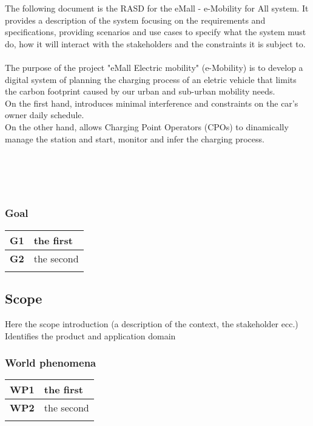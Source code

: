 The following document is the RASD for the eMall - e-Mobility for All system. It provides
a description of the system focusing on the requirements and specifications, providing scenarios and use cases
to specify what the system must do, how it will interact with the stakeholders and the constraints it is subject to.
\\\\
The purpose of the project "eMall Electric mobility" 
(e-Mobility) is to develop a digital system of 
planning the charging process of an eletric vehicle
that limits the carbon footprint caused by our urban and
sub-urban mobility needs.\\On the first hand, introduces minimal interference
and constraints on the car's owner daily schedule.
\\On the other hand, allows Charging Point Operators (CPOs)
to dinamically manage the station and start, monitor and infer the 
charging process.
\\\\
\\\\\\

\subsubsection*{Goal}
\begin{table}[h]
    \begin{tabular}{|l|l|}
        \toprule
        \textbf{G1} & the first  \\ \midrule
        \textbf{G2} & the second \\ \midrule
                    &            \\ \bottomrule
    \end{tabular}
\end{table}

\subsection{Scope}
Here the scope introduction (a description of the context, the stakeholder ecc.)
Identifies the product and application domain
\subsubsection*{World phenomena}
\begin{table}[h]
    \begin{tabular}{|l|l|}
        \toprule
        \textbf{WP1} & the first  \\ \midrule
        \textbf{WP2} & the second \\ \midrule
                     &            \\ \bottomrule
    \end{tabular}
\end{table}
